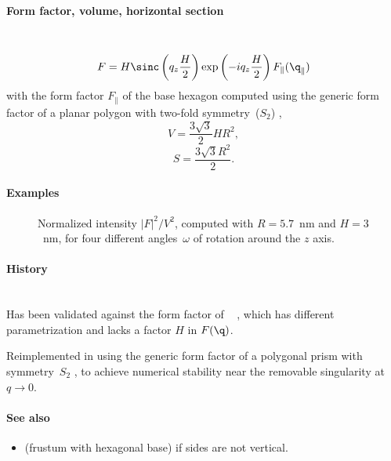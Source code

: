 \paragraph{Form factor, volume, horizontal section}\strut\\
\begin{equation*}
F = H \sinc\left(q_z\frac{H}{2}\right) \exp\left(-i q_z\frac{ H}{2}\right) F_\parallel(\q_\parallel)
\end{equation*}
with the form factor $F_\parallel$ of the base hexagon
computed using the generic form factor of a planar polygon
with two-fold symmetry~($S_2$) \cite{Wut17},
\begin{equation*}
  V = \dfrac{3\sqrt{3}}{2}H R^2,
\end{equation*}
\begin{equation*}
  S =\dfrac{3\sqrt{3}R^2}{2}.
\end{equation*}

\paragraph{Examples}\strut\nopagebreak

\begin{figure}[H]
\begin{center}
\end{center}
\caption{Normalized intensity $|F|^2/V^2$,
computed with $R=5.7$~nm and $H=3$~nm,
for four different angles~$\omega$ of rotation around the $z$ axis.}
\label{fig:FFprism6Ex}
\end{figure}

\paragraph{History}\strut\\
Has been validated against the  form factor of \IsGISAXS\
\cite[Eq.~2.31]{Laz06} \cite[Eq.~221]{ReLL09},
which has different parametrization
and lacks a factor $H$ in $F(\q)$.

Reimplemented in  using the generic form factor
of a polygonal prism with symmetry~$S_2$ \cite{Wut17},
to achieve numerical stability near the removable singularity at $q\to0$.

\paragraph{See also}
\begin{itemize}
\item {} (frustum with hexagonal base) if sides are not vertical.
\end{itemize}


